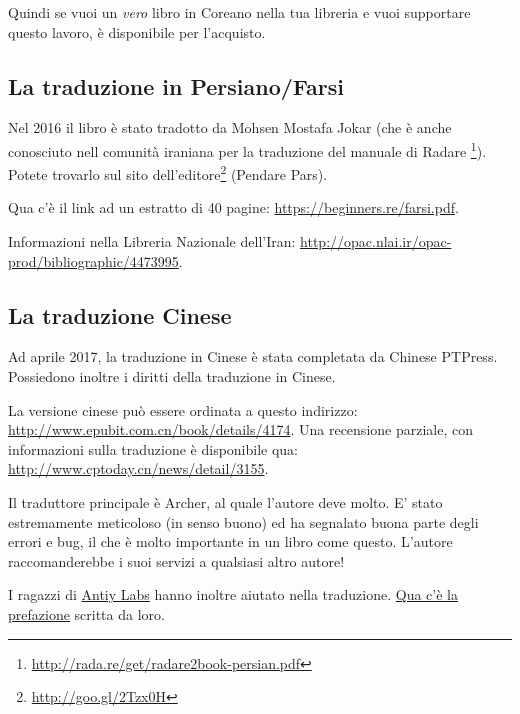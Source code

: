 Quindi se vuoi un \emph{vero} libro in Coreano nella tua libreria e
vuoi supportare questo lavoro, è disponibile per l'acquisto.

\subsection*{La traduzione in Persiano/Farsi}

Nel 2016 il libro è stato tradotto da Mohsen Mostafa Jokar (che è anche conosciuto nell comunità iraniana per la traduzione del manuale di Radare \footnote{\url{http://rada.re/get/radare2book-persian.pdf}}).
Potete trovarlo sul sito dell'editore\footnote{\url{http://goo.gl/2Tzx0H}} (Pendare Pars).

Qua c'è il link ad un estratto di 40 pagine: \url{https://beginners.re/farsi.pdf}.

Informazioni nella Libreria Nazionale dell'Iran: \url{http://opac.nlai.ir/opac-prod/bibliographic/4473995}.

\subsection*{La traduzione Cinese}

Ad aprile 2017, la traduzione in Cinese è stata completata da Chinese PTPress. Possiedono inoltre i diritti della traduzione in Cinese.

La versione cinese può essere ordinata a questo indirizzo: \url{http://www.epubit.com.cn/book/details/4174}. Una recensione parziale, con informazioni sulla traduzione è disponibile qua: \url{http://www.cptoday.cn/news/detail/3155}.

Il traduttore principale è Archer, al quale l'autore deve molto. E' stato estremamente meticoloso (in senso buono) ed ha segnalato buona parte degli errori e bug, il che è molto importante in un libro come questo.
L'autore raccomanderebbe i suoi servizi a qualsiasi altro autore!

I ragazzi di \href{http://www.antiy.net/}{Antiy Labs} hanno inoltre aiutato nella traduzione. \href{http://www.epubit.com.cn/book/onlinechapter/51413}{Qua c'è la prefazione} scritta da loro.
